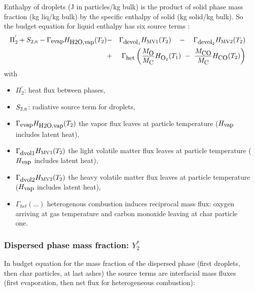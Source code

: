 Enthalpy of droplets (J in particles/kg bulk) is the product of solid phase mass
fraction (kg liq/kg bulk) by the specific enthalpy of solid (kg solid/kg
bulk). So the budget equation for liquid enthalpy has six source terms :
\begin{eqnarray}
\Pi_{2}^{'}+S_{2,\mbox{\scriptsize\textsc{r}}}-\Gamma_{\mbox{\small evap}}H_{\mbox{\small H2O,vap}}(T_{2}) & - & \Gamma_{\mbox{\small devol}_1}H_{\mbox{\scriptsize MV1}}(T_{2})\quad-\quad \Gamma_{\mbox{\small devol}_2}H_{\mbox{\scriptsize MV2}}(T_{2}) \nonumber\\
                                                   & + &\Gamma_{\mbox{\small het}}\left( \frac{M_{\mbox{\small O}}}{M_{\mbox{\small C}}}H_{\mbox{\small O}_{2}}(T_{1})~ - ~\frac{M_{\mbox{\small CO}}}{M_{\mbox{\small C}}}H_{\mbox{\small CO}}(T_{2})\right) 
\end{eqnarray}
with
\begin{itemize}
  \item $\Pi_{2}^{'}$: heat flux between phases,
  \item $S_{2,\mbox{\scriptsize\textsc{r}}}$: radiative source term for droplets,
  \item $\Gamma_{\mbox{\small evap}}H_{\mbox{\small H2O,vap}}(T_{2})$ the vapor
    flux leaves at particle temperature ($H_{\mbox{\small vap}}$ includes latent
    heat),
  \item $\Gamma_{\mbox{\small dvol1}}H_{\mbox{\scriptsize MV1}}(T_{2})$ the
    light volatile matter flux leaves at particle temperature ($H_{\mbox{\small
        vap}}$ includes latent heat),
  \item $\Gamma_{\mbox{\small dvol2}}H_{\mbox{\scriptsize MV2}}(T_{2})$ the
    heavy volatile matter flux leaves at particle temperature ($H_{\mbox{\small
        vap}}$ includes latent heat),
  \item $\Gamma_{het}(...)$ heterogenous combustion induces reciprocal mass
    flux: oxygen arriving at gas temperature and carbon monoxide leaving at char
    particle one.
\end{itemize}

\subsubsection{Dispersed phase mass fraction: $Y_{2}^{*}$}

In budget equation for the mass fraction of the dispersed phase (first droplets,
then char particles, at last ashes) the source terms are interfacial mass fluxes
(first evaporation, then net flux for heterogeneous combustion):

